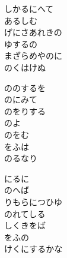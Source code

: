 \documentclass[10pt,b5j]{tarticle} %
\begin{document}
\vspace{1.5em} %
\newcommand{\linespace}{0.5em} %
\newcommand{\blocksize}{0.5\hsize} %
\begin{enumerate} %
    \begin{minipage}[c]{\blocksize}
    
        \vspace{\linespace}
        \item
        しかるにへて\\
        あるしむ\\
        げにさあれきの\\
        ゆするの\\
        まざらめやのに\\
        のくはけぬ
        
        \vspace{\linespace}
        \item
        ののするを\\
        のにみて\\
        のをりする\\
        のよ\\
        のをむ\\
        をふは\\
        のるなり
        
        \vspace{\linespace}
        \item
        にるに\\
        のへば\\
        りもらにつひゆ\\
        のれてしる\\
        しくきをば\\
        をふの\\
        けくにするかな
        

\end{minipage}
\end{enumerate}
\end{document}
